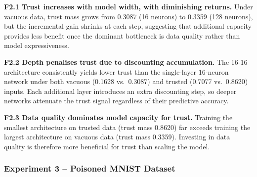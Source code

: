 \begin{tcolorbox}[title=Key findings -- Experiment 2, colback=gray!5,
colframe=gray!40, fonttitle=\bfseries, left=4pt, right=4pt,
top=4pt, bottom=4pt]

\textbf{F2.1 Trust increases with model width, with diminishing returns.} Under vacuous data, trust mass grows from 0.3087 (16 neurons) to 0.3359 (128 neurons), but the incremental gain shrinks at each step, suggesting that additional capacity provides less benefit once the dominant bottleneck is data quality rather than model expressiveness.

\medskip
\textbf{F2.2 Depth penalises trust due to discounting accumulation.} The 16-16 architecture consistently yields lower trust than the single-layer 16-neuron network under both vacuous (0.1628 vs.\ 0.3087) and trusted (0.7077 vs.\ 0.8620) inputs. Each additional layer introduces an extra discounting step, so deeper networks attenuate the trust signal regardless of their predictive accuracy.

\medskip
\textbf{F2.3 Data quality dominates model capacity for trust.} Training the smallest architecture on trusted data (trust mass 0.8620) far exceeds training the largest architecture on vacuous data (trust mass 0.3359). Investing in data quality is therefore more beneficial for trust than scaling the model.
\end{tcolorbox}


\subsubsection*{Experiment 3 -- Poisoned MNIST Dataset}
\begin{table}[ht]
\centering
{}
\caption{Summary of results for the Poisoned MNIST Classification Experiment.}
\label{tab:mnistpois}
\end{table}


